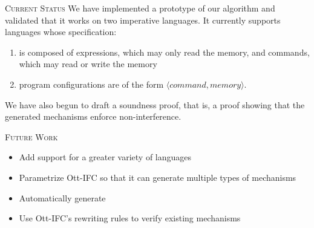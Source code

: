 \documentclass[final]{beamer}
\newlength{\onecolwid}
\begin{document}
\begin{frame}[fragile]
\begin{columns}[t]
\begin{column}{\onecolwid}
\begin{block}{\textsc{Current Status}}
We have implemented a prototype of our algorithm and validated that it works on two imperative languages. It currently supports languages whose specification: 
\begin{enumerate}
\item is composed of expressions, which may only read the memory, and commands, which may read or write the memory
\item program configurations are of the form $\langle command, memory\rangle$. 
\end{enumerate}

We have also begun to draft a soundness proof, that is, a proof showing that the generated mechanisms enforce non-interference.


\end{block}

\begin{block}{\textsc{Future Work}}
    \begin{itemize}
        \item Add support for a greater variety of languages
        \item Parametrize Ott-IFC so that it can generate multiple types of mechanisms
        \item Automatically generate 
        \item Use Ott-IFC's rewriting rules to verify existing mechanisms
    \end{itemize}
\end{block}

%        

%    
%    
\end{column}
\end{columns}
\end{frame}
\end{document}
